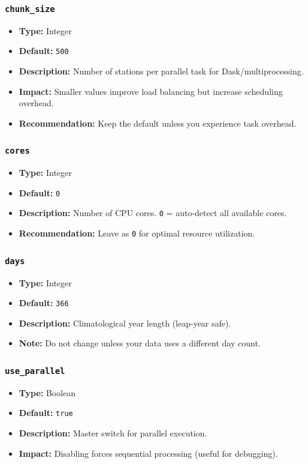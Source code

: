 \documentclass[12pt,a4paper]{article}
\begin{document}
\subsubsection{\texttt{chunk\_size}}
\begin{itemize}[leftmargin=*]
    \item \textbf{Type:} Integer
    \item \textbf{Default:} \texttt{500}
    \item \textbf{Description:} Number of stations per parallel task for Dask/multiprocessing.
    \item \textbf{Impact:} Smaller values improve load balancing but increase scheduling overhead.
    \item \textbf{Recommendation:} Keep the default unless you experience task overhead.
\end{itemize}

\subsubsection{\texttt{cores}}
\begin{itemize}[leftmargin=*]
    \item \textbf{Type:} Integer
    \item \textbf{Default:} \texttt{0}
    \item \textbf{Description:} Number of CPU cores. \texttt{0} = auto-detect all available cores.
    \item \textbf{Recommendation:} Leave as \texttt{0} for optimal resource utilization.
\end{itemize}

\subsubsection{\texttt{days}}
\begin{itemize}[leftmargin=*]
    \item \textbf{Type:} Integer
    \item \textbf{Default:} \texttt{366}
    \item \textbf{Description:} Climatological year length (leap-year safe).
    \item \textbf{Note:} Do not change unless your data uses a different day count.
\end{itemize}

\subsubsection{\texttt{use\_parallel}}
\begin{itemize}[leftmargin=*]
    \item \textbf{Type:} Boolean
    \item \textbf{Default:} \texttt{true}
    \item \textbf{Description:} Master switch for parallel execution.
    \item \textbf{Impact:} Disabling forces sequential processing (useful for debugging).
\end{itemize}
\end{document}
